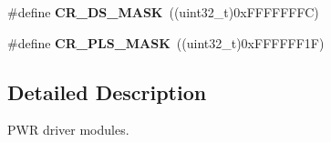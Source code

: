 \begin{DoxyCompactItemize}
\item 
\hypertarget{group___p_w_r_ga8ee6bf9218f3c476629dd9ee70deef21}{}\#define {\bfseries C\+R\+\_\+\+D\+S\+\_\+\+M\+A\+S\+K}~((uint32\+\_\+t)0x\+F\+F\+F\+F\+F\+F\+F\+C)\label{group___p_w_r_ga8ee6bf9218f3c476629dd9ee70deef21}

\item 
\hypertarget{group___p_w_r_gac4a30eebdd1d292331a578b189962e77}{}\#define {\bfseries C\+R\+\_\+\+P\+L\+S\+\_\+\+M\+A\+S\+K}~((uint32\+\_\+t)0x\+F\+F\+F\+F\+F\+F1\+F)\label{group___p_w_r_gac4a30eebdd1d292331a578b189962e77}

\end{DoxyCompactItemize}


\subsection{Detailed Description}
P\+W\+R driver modules. 

